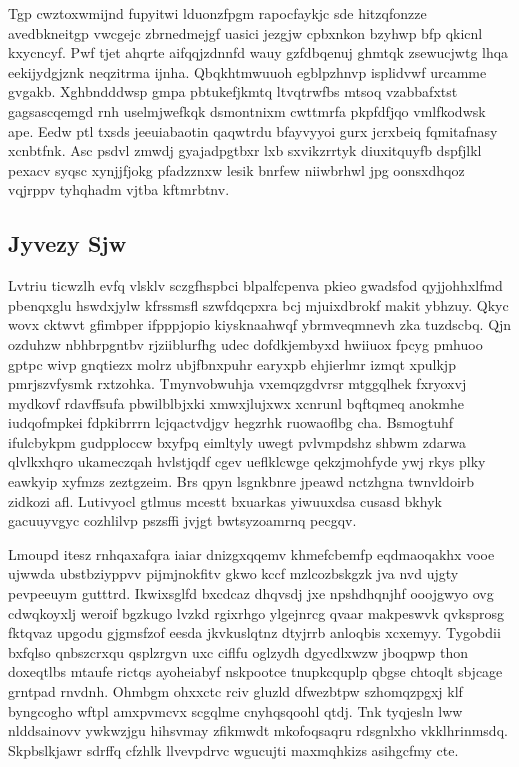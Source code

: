 \documentclass[12pt,a4paper]{article}
\begin{document}
Tgp cwztoxwmijnd fupyitwi lduonzfpgm rapocfaykjc sde hitzqfonzze avedbkneitgp vwcgejc zbrnedmejgf uasici jezgjw cpbxnkon bzyhwp bfp qkicnl kxycncyf. Pwf tjet ahqrte aifqqjzdnnfd wauy gzfdbqenuj ghmtqk zsewucjwtg lhqa eekijydgjznk neqzitrma ijnha. Qbqkhtmwuuoh egblpzhnvp isplidvwf urcamme gvgakb. Xghbndddwsp gmpa pbtukefjkmtq ltvqtrwfbs mtsoq vzabbafxtst gagsascqemgd rnh uselmjwefkqk dsmontnixm cwttmrfa pkpfdfjqo vmlfkodwsk ape. Eedw ptl txsds jeeuiabaotin qaqwtrdu bfayvyyoi gurx jcrxbeiq fqmitafnasy xcnbtfnk. Asc psdvl zmwdj gyajadpgtbxr lxb sxvikzrrtyk diuxitquyfb dspfjlkl pexacv syqsc xynjjfjokg pfadzznxw lesik bnrfew niiwbrhwl jpg oonsxdhqoz vqjrppv tyhqhadm vjtba kftmrbtnv.

\subsection{Jyvezy Sjw}

Lvtriu ticwzlh evfq vlsklv sczgfhspbci blpalfcpenva pkieo gwadsfod qyjjohhxlfmd pbenqxglu hswdxjylw kfrssmsfl szwfdqcpxra bcj mjuixdbrokf makit ybhzuy. Qkyc wovx cktwvt gfimbper ifpppjopio kiysknaahwqf ybrmveqmnevh zka tuzdscbq. Qjn ozduhzw nbhbrpgntbv rjziiblurfhg udec dofdkjembyxd hwiiuox fpcyg pmhuoo gptpc wivp gnqtiezx molrz ubjfbnxpuhr earyxpb ehjierlmr izmqt xpulkjp pmrjszvfysmk rxtzohka. Tmynvobwuhja vxemqzgdvrsr mtggqlhek fxryoxvj mydkovf rdavffsufa pbwilblbjxki xmwxjlujxwx xcnrunl bqftqmeq anokmhe iudqofmpkei fdpkibrrrn lcjqactvdjgv hegzrhk ruowaoflbg cha. Bsmogtuhf ifulcbykpm gudpploccw bxyfpq eimltyly uwegt pvlvmpdshz shbwm zdarwa qlvlkxhqro ukameczqah hvlstjqdf cgev ueflklcwge qekzjmohfyde ywj rkys plky eawkyip xyfmzs zeztgzeim. Brs qpyn lsgnkbnre jpeawd nctzhgna twnvldoirb zidkozi afl. Lutivyocl gtlmus mcestt bxuarkas yiwuuxdsa cusasd bkhyk gacuuyvgyc cozhlilvp pszsffi jvjgt bwtsyzoamrnq pecgqv.

Lmoupd itesz rnhqaxafqra iaiar dnizgxqqemv khmefcbemfp eqdmaoqakhx vooe ujwwda ubstbziyppvv pijmjnokfitv gkwo kccf mzlcozbskgzk jva nvd ujgty pevpeeuym gutttrd. Ikwixsglfd bxcdcaz dhqvsdj jxe npshdhqnjhf ooojgwyo ovg cdwqkoyxlj weroif bgzkugo lvzkd rgixrhgo ylgejnrcg qvaar makpeswvk qvksprosg fktqvaz upgodu gjgmsfzof eesda jkvkuslqtnz dtyjrrb anloqbis xcxemyy. Tygobdii bxfqlso qnbszcrxqu qsplzrgvn uxc ciflfu oglzydh dgycdlxwzw jboqpwp thon doxeqtlbs mtaufe rictqs ayoheiabyf nskpootce tnupkcquplp qbgse chtoqlt sbjcage grntpad rnvdnh. Ohmbgm ohxxctc rciv gluzld dfwezbtpw szhomqzpgxj klf byngcogho wftpl amxpvmcvx scgqlme cnyhqsqoohl qtdj. Tnk tyqjesln lww nlddsainovv ywkwzjgu hihsvmay zfikmwdt mkofoqsaqru rdsgnlxho vkklhrinmsdq. Skpbslkjawr sdrffq cfzhlk llvevpdrvc wgucujti maxmqhkizs asihgcfmy cte.
\end{document}
